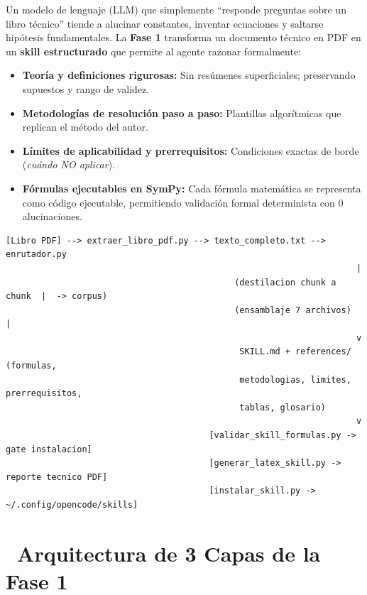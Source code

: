 \documentclass[11pt,a4paper]{article}
\newcommand{\iconotexto}[2]{\textcolor{cyanNeon}{\faIcon{#1}}~#2}
\begin{document}
Un modelo de lenguaje (LLM) que simplemente ``responde preguntas sobre un libro técnico'' tiende a alucinar constantes, inventar ecuaciones y saltarse hipótesis fundamentales. La \textbf{Fase 1} transforma un documento técnico en PDF en un \textbf{skill estructurado} que permite al agente razonar formalmente:
\begin{itemize}[leftmargin=*]
  \item \textbf{Teoría y definiciones rigurosas:} Sin resúmenes superficiales; preservando supuestos y rango de validez.
  \item \textbf{Metodologías de resolución paso a paso:} Plantillas algorítmicas que replican el método del autor.
  \item \textbf{Límites de aplicabilidad y prerrequisitos:} Condiciones exactas de borde (\textit{cuándo NO aplicar}).
  \item \textbf{Fórmulas ejecutables en SymPy:} Cada fórmula matemática se representa como código ejecutable, permitiendo validación formal determinista con 0 alucinaciones.
\end{itemize}

\begin{tcolorbox}[cajaContenido, title={\faIcon{project-diagram}~Pipeline E2E de Destilación de la Fase 1}]
\begin{lstlisting}
[Libro PDF] --> extraer_libro_pdf.py --> texto_completo.txt --> enrutador.py
                                                                     |
                                             (destilacion chunk a chunk  |  -> corpus)
                                             (ensamblaje 7 archivos)    |
                                                                     v
                                              SKILL.md + references/ (formulas,
                                              metodologias, limites, prerrequisitos,
                                              tablas, glosario)
                                                                     v
                                        [validar_skill_formulas.py -> gate instalacion]
                                        [generar_latex_skill.py -> reporte tecnico PDF]
                                        [instalar_skill.py -> ~/.config/opencode/skills]
\end{lstlisting}
\end{tcolorbox}

\section[Arquitectura de 3 Capas (Fase 1)]{\iconotexto{layer-group}{Arquitectura de 3 Capas de la Fase 1}}
\end{document}

